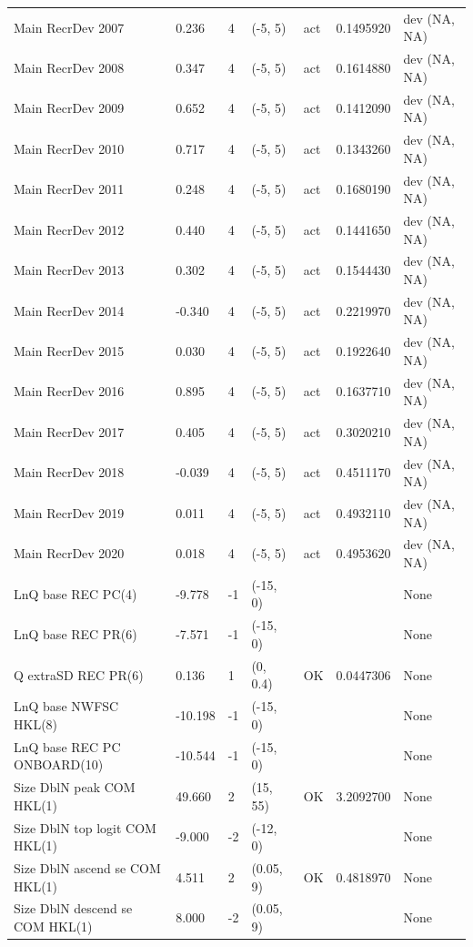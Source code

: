 \documentclass[11pt,
  english,
]{article}
\begin{document}
\begin{landscape}
\begin{longtable}[t]{lllllll}
Main RecrDev 2007 & 0.236 & 4 & (-5, 5) & act & 0.1495920 & dev (NA, NA)\\
\addlinespace
Main RecrDev 2008 & 0.347 & 4 & (-5, 5) & act & 0.1614880 & dev (NA, NA)\\
Main RecrDev 2009 & 0.652 & 4 & (-5, 5) & act & 0.1412090 & dev (NA, NA)\\
Main RecrDev 2010 & 0.717 & 4 & (-5, 5) & act & 0.1343260 & dev (NA, NA)\\
Main RecrDev 2011 & 0.248 & 4 & (-5, 5) & act & 0.1680190 & dev (NA, NA)\\
Main RecrDev 2012 & 0.440 & 4 & (-5, 5) & act & 0.1441650 & dev (NA, NA)\\
\addlinespace
Main RecrDev 2013 & 0.302 & 4 & (-5, 5) & act & 0.1544430 & dev (NA, NA)\\
Main RecrDev 2014 & -0.340 & 4 & (-5, 5) & act & 0.2219970 & dev (NA, NA)\\
Main RecrDev 2015 & 0.030 & 4 & (-5, 5) & act & 0.1922640 & dev (NA, NA)\\
Main RecrDev 2016 & 0.895 & 4 & (-5, 5) & act & 0.1637710 & dev (NA, NA)\\
Main RecrDev 2017 & 0.405 & 4 & (-5, 5) & act & 0.3020210 & dev (NA, NA)\\
\addlinespace
Main RecrDev 2018 & -0.039 & 4 & (-5, 5) & act & 0.4511170 & dev (NA, NA)\\
Main RecrDev 2019 & 0.011 & 4 & (-5, 5) & act & 0.4932110 & dev (NA, NA)\\
Main RecrDev 2020 & 0.018 & 4 & (-5, 5) & act & 0.4953620 & dev (NA, NA)\\
LnQ base REC PC(4) & -9.778 & -1 & (-15, 0) &  &  & None\\
LnQ base REC PR(6) & -7.571 & -1 & (-15, 0) &  &  & None\\
\addlinespace
Q extraSD REC PR(6) & 0.136 & 1 & (0, 0.4) & OK & 0.0447306 & None\\
LnQ base NWFSC HKL(8) & -10.198 & -1 & (-15, 0) &  &  & None\\
LnQ base REC PC ONBOARD(10) & -10.544 & -1 & (-15, 0) &  &  & None\\
Size DblN peak COM HKL(1) & 49.660 & 2 & (15, 55) & OK & 3.2092700 & None\\
Size DblN top logit COM HKL(1) & -9.000 & -2 & (-12, 0) &  &  & None\\
\addlinespace
Size DblN ascend se COM HKL(1) & 4.511 & 2 & (0.05, 9) & OK & 0.4818970 & None\\
Size DblN descend se COM HKL(1) & 8.000 & -2 & (0.05, 9) &  &  & None\\

\end{longtable}
\end{landscape}
\end{document}
